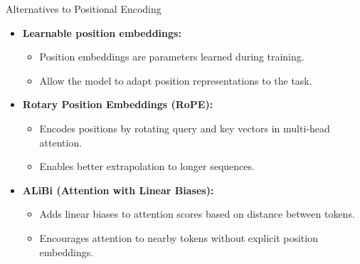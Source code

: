 \begin{frame}{Alternatives to Positional Encoding}
  \begin{itemize}
    \item[\textcolor{red}{$\blacktriangleright$}] \textbf{Learnable position embeddings:}
    \begin{itemize}
      \item Position embeddings are parameters learned during training.
      \item Allow the model to adapt position representations to the task.
    \end{itemize}
    \vspace{0.5em}
    \item[\textcolor{red}{$\blacktriangleright$}] \textbf{Rotary Position Embeddings (RoPE):}
    \begin{itemize}
      \item Encodes positions by rotating query and key vectors in multi-head attention.
      \item Enables better extrapolation to longer sequences.
    \end{itemize}
    \vspace{0.5em}
    \item[\textcolor{red}{$\blacktriangleright$}] \textbf{ALiBi (Attention with Linear Biases):}
    \begin{itemize}
      \item Adds linear biases to attention scores based on distance between tokens.
      \item Encourages attention to nearby tokens without explicit position embeddings.
    \end{itemize}
  \end{itemize}
\end{frame}

